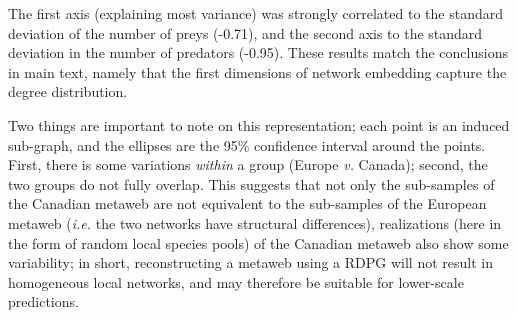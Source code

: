 The first axis (explaining most variance) was strongly correlated to the
standard deviation of the number of preys (-0.71), and the second axis
to the standard deviation in the number of predators (-0.95). These
results match the conclusions in main text, namely that the first
dimensions of network embedding capture the degree distribution.

Two things are important to note on this representation; each point is
an induced sub-graph, and the ellipses are the 95\% confidence interval
around the points. First, there is some variations \emph{within} a group
(Europe \emph{v.} Canada); second, the two groups do not fully overlap.
This suggests that not only the sub-samples of the Canadian metaweb are
not equivalent to the sub-samples of the European metaweb (\emph{i.e.}
the two networks have structural differences), realizations (here in the
form of random local species pools) of the Canadian metaweb also show
some variability; in short, reconstructing a metaweb using a RDPG will
not result in homogeneous local networks, and may therefore be suitable
for lower-scale predictions.